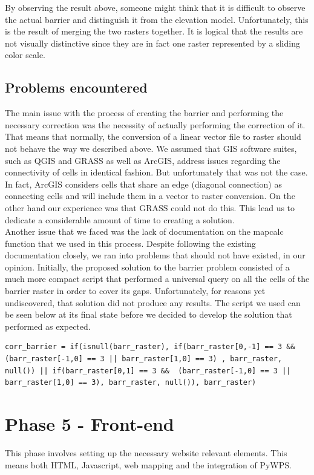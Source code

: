 By observing the result above, someone might think that it is difficult to observe the actual barrier and distinguish it from the elevation model. Unfortunately, this is the result of merging the two rasters together. It is logical that the results are not visually distinctive since they are in fact one raster represented by a sliding color scale.

\subsection{Problems encountered}
The main issue with the process of creating the barrier and performing the necessary correction was the necessity of actually performing the correction of it. That means that normally, the conversion of a linear vector file to raster should not behave the way we described above. We assumed that GIS software suites, such as QGIS and GRASS as well as ArcGIS, address issues regarding the connectivity of cells in identical fashion. But unfortunately that was not the case. In fact, ArcGIS considers cells that share an edge (diagonal connection) as connecting cells and will include them in a vector to raster conversion. On the other hand our experience was that GRASS could not do this. This lead us to dedicate a considerable amount of time to creating a solution.\\

Another issue that we faced was the lack of documentation on the mapcalc function that we used in this process. Despite following the existing documentation closely, we ran into problems that should not have existed, in our opinion. Initially, the proposed solution to the barrier problem consisted of a much more compact script that performed a universal query on all the cells of the barrier raster in order to cover its gaps. Unfortunately, for reasons yet undiscovered, that solution did not produce any results. The script we used can be seen below at its final state before we decided to develop the solution that performed as expected.

\begin{lstlisting}
corr_barrier = if(isnull(barr_raster), if(barr_raster[0,-1] == 3 && (barr_raster[-1,0] == 3 || barr_raster[1,0] == 3) , barr_raster, null()) || if(barr_raster[0,1] == 3 &&  (barr_raster[-1,0] == 3 || barr_raster[1,0] == 3), barr_raster, null()), barr_raster)
\end{lstlisting}

\section{Phase 5 - Front-end}
This phase involves setting up the necessary website relevant elements. This means both HTML, Javascript, web mapping and the integration of PyWPS.\\

